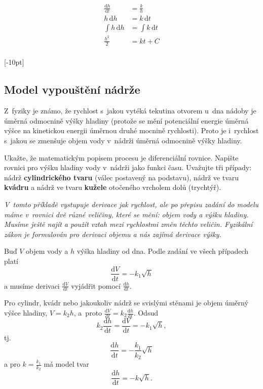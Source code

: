 $$
\begin{aligned}
\frac{\mathrm dh}{\mathrm dt}&=\frac kh\\
h\,\mathrm dh&=k\, \mathrm dt\\
\int h\,\mathrm dh&=\int k\, \mathrm dt\\
\frac {h^2}{2}&=kt+C\\
\end{aligned}
$$



\konec 


\stranka

[-10pt]
\subsection{Model vypouštění nádrže} \label{vypousteni} Z fyziky je známo, že rychlost s jakou
vytéká tekutina otvorem u dna nádoby je úměrná odmocnině výšky hladiny
(protože se mění potenciální energie úměrná výšce na kinetickou
energii úměrnou druhé mocnině rychlosti). Proto je i rychlost s jakou
se zmenšuje objem vody v nádrži úměrná odmocnině výšky
hladiny.

Ukažte, že matematickým popisem procesu je diferenciální rovnice.
Napište rovnici pro výšku hladiny vody v nádrži jako funkci času.
Uvažujte tři případy:
nádrž \textbf{cylindrického tvaru} (válec postavený na podstavu),
nádrž ve tvaru
\textbf{kvádru} 
a nádrž ve tvaru \textbf{kužele} otočeného vrcholem dolů (trychtýř). 


\textit{V tomto příkladě vystupuje derivace jak rychlost, ale po přepisu zadání do modelu máme v rovnici dvě různé veličiny, které se mění: objem vody a výšku hladiny. Musíme ještě najít a použít vztah mezi rychlostmi změn těchto veličin. Fyzikální zákon je formulován pro derivaci objemu a nás zajímá derivace výšky.}

\reseni
Buď $V$ objem vody a $h$ výška hladiny od dna.
Podle zadání ve všech případech platí $$\frac {\mathrm dV}{\mathrm dt}=-k_1\sqrt h$$ a musíme derivaci $\frac {\mathrm dV}{\mathrm dt}$ vyjádřit pomocí $\frac {\mathrm dh}{\mathrm dt}$.

Pro cylindr, kvádr nebo jakoukoliv nádrž se svislými stěnami je objem úměrný výšce hladiny, $V=k_2 h$, a proto $\frac {\mathrm dV}{\mathrm dt}=k_2\frac {\mathrm dh}{\mathrm dt}$. Odsud
$$k_2\frac {\mathrm dh}{\mathrm dt}=\frac {\mathrm dV}{\mathrm dt}=-k_1\sqrt h,$$
tj.
$$\frac {\mathrm dh}{\mathrm dt}=-\frac{k_1}{k_2}\sqrt h$$
a pro $k=\frac{k_1}{k_2}$ má model tvar
$$\frac {\mathrm dh}{\mathrm dt}=-k\sqrt h.$$

